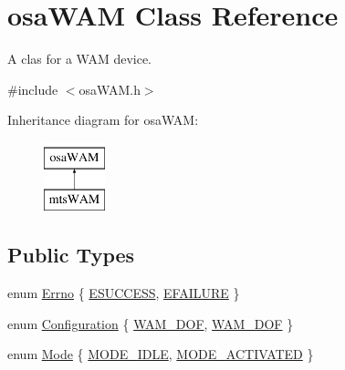 \hypertarget{classosa_w_a_m}{\section{osa\-W\-A\-M Class Reference}
\label{classosa_w_a_m}
}


A clas for a W\-A\-M device.  




{\ttfamily \#include $<$osa\-W\-A\-M.\-h$>$}

Inheritance diagram for osa\-W\-A\-M\-:\begin{figure}[H]
\begin{center}
\leavevmode
\includegraphics[height=2.000000cm]{d0/dfc/classosa_w_a_m}
\end{center}
\end{figure}
\subsection*{Public Types}
\begin{DoxyCompactItemize}
\item 
enum \hyperlink{classosa_w_a_m_aff15893cc52d67e46cb66de794109f9e}{Errno} \{ \hyperlink{classosa_w_a_m_aff15893cc52d67e46cb66de794109f9ea3ceea4462076eb66774b53a9e284ba99}{E\-S\-U\-C\-C\-E\-S\-S}, 
\hyperlink{classosa_w_a_m_aff15893cc52d67e46cb66de794109f9ea431d95fc5d82de9b4b25cd9b605d4ab3}{E\-F\-A\-I\-L\-U\-R\-E}
 \}
\item 
enum \hyperlink{classosa_w_a_m_ada0b00e10e6401b6b1801cd08f30748b}{Configuration} \{ \hyperlink{classosa_w_a_m_ada0b00e10e6401b6b1801cd08f30748baa9cabb285790b5bc0707d0fed0999a44}{W\-A\-M\-\_\-D\-O\-F}, 
\hyperlink{classosa_w_a_m_ada0b00e10e6401b6b1801cd08f30748ba1bdf2662bd26c893783934b814db4ac3}{W\-A\-M\-\_\-D\-O\-F}
 \}
\item 
enum \hyperlink{classosa_w_a_m_a3671dc191688751cf712bbbd5f36a0d0}{Mode} \{ \hyperlink{classosa_w_a_m_a3671dc191688751cf712bbbd5f36a0d0a80cc56decb5062248b58b30a4a438e90}{M\-O\-D\-E\-\_\-\-I\-D\-L\-E}, 
\hyperlink{classosa_w_a_m_a3671dc191688751cf712bbbd5f36a0d0a3bad271377f3201594b335aa5ea0c663}{M\-O\-D\-E\-\_\-\-A\-C\-T\-I\-V\-A\-T\-E\-D}
 \}
\end{DoxyCompactItemize}
